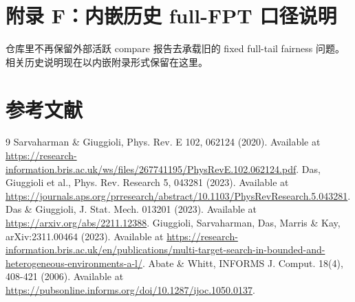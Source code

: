 \documentclass[11pt]{ctexart}
\newcommand{\TabDir}{../artifacts/tables}
\begin{document}
\section{附录 F：内嵌历史 full-FPT 口径说明}
仓库里不再保留外部活跃 compare 报告去承载旧的 fixed full-tail fairness 问题。相关历史说明现在以内嵌附录形式保留在这里。
\begin{table}[H]
\centering\small
\resizebox{\linewidth}{!}{%

}
\caption{统一报告内部保留的历史公平口径说明。}
\end{table}
\clearpage
\section*{参考文献}
\begin{thebibliography}{9}
 Sarvaharman \& Giuggioli, Phys. Rev. E 102, 062124 (2020). Available at \url{https://research-information.bris.ac.uk/ws/files/267741195/PhysRevE.102.062124.pdf}.
 Das, Giuggioli et al., Phys. Rev. Research 5, 043281 (2023). Available at \url{https://journals.aps.org/prresearch/abstract/10.1103/PhysRevResearch.5.043281}.
 Das \& Giuggioli, J. Stat. Mech. 013201 (2023). Available at \url{https://arxiv.org/abs/2211.12388}.
 Giuggioli, Sarvaharman, Das, Marris \& Kay, arXiv:2311.00464 (2023). Available at \url{https://research-information.bris.ac.uk/en/publications/multi-target-search-in-bounded-and-heterogeneous-environments-a-l/}.
 Abate \& Whitt, INFORMS J. Comput. 18(4), 408-421 (2006). Available at \url{https://pubsonline.informs.org/doi/10.1287/ijoc.1050.0137}.
\end{thebibliography}
\end{document}
